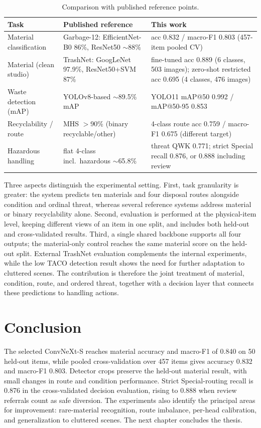\begin{table}[!h]
\centering
\caption{Comparison with published reference points.}
\label{tab:compare}
\begin{tabularx}{\linewidth}{@{}p{2.9cm} Y Y@{}}
\toprule
\textbf{Task} & \textbf{Published reference} & \textbf{This work} \\
\midrule
Material classification & Garbage-12: EfficientNet-B0 86\%, ResNet50 $\sim$88\% \cite{garbage12} & acc 0.832 / macro-F1 0.803 (457-item pooled CV) \\
\addlinespace[5pt]
Material (clean studio) & TrashNet: GoogLeNet 97.9\%, ResNet50+SVM 87\% \cite{trashnet} & fine-tuned acc 0.889 (6 classes, 503 images); zero-shot restricted acc 0.695 (4 classes, 476 images) \\
\addlinespace[5pt]
Waste detection (mAP) & YOLOv8-based $\sim$89.5\% mAP \cite{hybridyolocnn} & YOLO11 mAP@50 0.992 / mAP@50-95 0.853 \\
\addlinespace[5pt]
Recyclability / route & MHS $>$90\% (binary recyclable/other) \cite{mhs} & 4-class route acc 0.759 / macro-F1 0.675 (different target) \\
\addlinespace[5pt]
Hazardous handling & flat 4-class incl.\ hazardous $\sim$65.8\% \cite{maskscoringwaste} & threat QWK 0.771; strict Special recall 0.876, or 0.888 including review \\
\bottomrule
\end{tabularx}
\end{table}

Three aspects distinguish the experimental setting. First, task granularity is greater: the system predicts ten materials and four disposal routes alongside condition and ordinal threat, whereas several reference systems address material or binary recyclability alone. Second, evaluation is performed at the physical-item level, keeping different views of an item in one split, and includes both held-out and cross-validated results. Third, a single shared backbone supports all four outputs; the material-only control reaches the same material score on the held-out split. External TrashNet evaluation complements the internal experiments, while the low TACO detection result shows the need for further adaptation to cluttered scenes. The contribution is therefore the joint treatment of material, condition, route, and ordered threat, together with a decision layer that connects these predictions to handling actions.

\section{Conclusion}
The selected ConvNeXt-S reaches material accuracy and macro-F1 of 0.840 on 50 held-out items, while pooled cross-validation over 457 items gives accuracy 0.832 and macro-F1 0.803. Detector crops preserve the held-out material result, with small changes in route and condition performance. Strict Special-routing recall is 0.876 in the cross-validated decision evaluation, rising to 0.888 when review referrals count as safe diversion. The experiments also identify the principal areas for improvement: rare-material recognition, route imbalance, per-head calibration, and generalization to cluttered scenes. The next chapter concludes the thesis.
